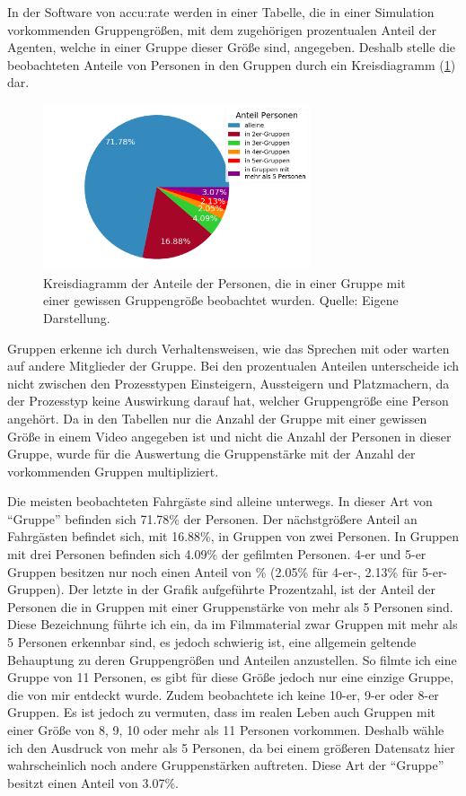 In der Software von accu:rate werden in einer Tabelle, die in einer Simulation vorkommenden Gruppengrößen, mit dem zugehörigen prozentualen Anteil der Agenten, welche in einer Gruppe dieser Größe sind, angegeben. Deshalb stelle die beobachteten Anteile von Personen in den Gruppen durch ein Kreisdiagramm (\figurename \ref{fig:AnteileGruppen}) dar.
\begin{figure}[H]
	\centering
		\includegraphics[width=0.7\textwidth]{pictures/data_evaluation/groups/groups.png}
	\caption{Kreisdiagramm der Anteile der Personen, die in einer Gruppe mit einer gewissen Gruppengröße beobachtet wurden. Quelle: Eigene Darstellung.}
	\label{fig:AnteileGruppen}
\end{figure}
Gruppen erkenne ich durch Verhaltensweisen, wie das Sprechen mit oder warten auf andere Mitglieder der Gruppe. Bei den prozentualen Anteilen unterscheide ich nicht zwischen den Prozesstypen Einsteigern, Aussteigern und Platzmachern, da der Prozesstyp keine Auswirkung darauf hat, welcher Gruppengröße eine Person angehört. Da in den Tabellen nur die Anzahl der Gruppe mit einer gewissen Größe in einem Video angegeben ist und nicht die Anzahl der Personen in dieser Gruppe, wurde für die Auswertung die Gruppenstärke mit der Anzahl der vorkommenden Gruppen multipliziert. 

Die meisten beobachteten Fahrgäste sind alleine unterwegs. In dieser Art von "`Gruppe"' befinden sich 71.78\% der Personen. Der nächstgrößere Anteil an Fahrgästen befindet sich, mit 16.88\%, in Gruppen von zwei Personen. In Gruppen mit drei Personen befinden sich 4.09\% der gefilmten Personen. 4-er und 5-er Gruppen besitzen nur noch einen Anteil von \% (2.05\% für 4-er-, 2.13\% für 5-er-Gruppen). Der letzte in der Grafik aufgeführte Prozentzahl, ist der Anteil der Personen die in Gruppen mit einer Gruppenstärke von mehr als 5 Personen sind. Diese Bezeichnung führte ich ein, da im Filmmaterial zwar Gruppen mit mehr als 5 Personen erkennbar sind, es jedoch schwierig ist, eine allgemein geltende Behauptung zu deren Gruppengrößen und Anteilen anzustellen. So filmte ich \zB eine Gruppe von 11 Personen, es gibt für diese Größe jedoch nur eine einzige Gruppe, die von mir entdeckt wurde. Zudem beobachtete ich keine 10-er, 9-er oder 8-er Gruppen. Es ist jedoch zu vermuten, dass im realen Leben auch Gruppen mit einer Größe von 8, 9, 10 oder mehr als 11 Personen vorkommen. Deshalb wähle ich den Ausdruck von mehr als 5 Personen, da bei einem größeren Datensatz hier wahrscheinlich noch andere Gruppenstärken auftreten. Diese Art der "`Gruppe"' besitzt einen Anteil von 3.07\%.

